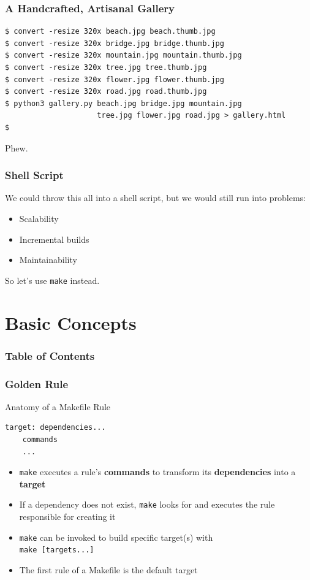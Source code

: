 \documentclass[xcolor=dvipsnames,t,compress]{beamer}
\begin{document}
\begin{frame}[fragile]
\frametitle{A Handcrafted, Artisanal Gallery}
\vspace{-1em}
\begin{verbatim}
$ convert -resize 320x beach.jpg beach.thumb.jpg
$ convert -resize 320x bridge.jpg bridge.thumb.jpg
$ convert -resize 320x mountain.jpg mountain.thumb.jpg
$ convert -resize 320x tree.jpg tree.thumb.jpg
$ convert -resize 320x flower.jpg flower.thumb.jpg
$ convert -resize 320x road.jpg road.thumb.jpg
$ python3 gallery.py beach.jpg bridge.jpg mountain.jpg
                     tree.jpg flower.jpg road.jpg > gallery.html
$
\end{verbatim}
Phew.
\end{frame}

\begin{frame}
\frametitle{Shell Script}
We could throw this all into a shell script, but we would still run into problems:
\begin{itemize}[<+->]
\item Scalability
\item Incremental builds
\item Maintainability
\end{itemize}
\pause
So let's use \texttt{make} instead.
\end{frame}


\section{Basic Concepts}

\begin{frame}
\frametitle{Table of Contents}
\tableofcontents[currentsection]
\end{frame}

\begin{frame}[fragile]
\frametitle{Golden Rule}
\begin{block}{Anatomy of a Makefile Rule}
\begin{verbatim}
target: dependencies...
	commands
	...
\end{verbatim}
\end{block}
\vspace{1em}
\begin{itemize}[<+->]
\item \texttt{make} executes a rule's \textbf{commands} to transform its \textbf{dependencies} into a \textbf{target}
\item If a dependency does not exist, \texttt{make} looks for and executes the rule responsible for creating it
\item \texttt{make} can be invoked to build specific target(s) with \\ \hspace{1em}\texttt{make [targets...]}
\item The first rule of a Makefile is the default target
\end{itemize}
\end{frame}
\end{document}
